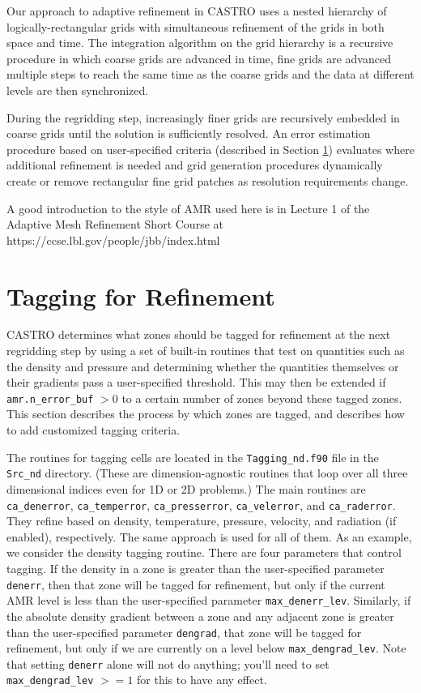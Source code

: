 Our approach to adaptive refinement in CASTRO uses a nested
hierarchy of logically-rectangular grids with simultaneous refinement
of the grids in both space and time.  The integration algorithm on the grid hierarchy
is a recursive procedure in which coarse grids are advanced in time,
fine grids are advanced multiple steps to reach the same time
as the coarse grids and the data at different levels are then synchronized.

During the regridding step, increasingly finer grids
are recursively embedded in coarse grids until the solution is
sufficiently resolved.  An error estimation procedure based on
user-specified criteria (described in Section \ref{sec:tagging}) 
evaluates where additional refinement is needed
and grid generation procedures dynamically create or
remove rectangular fine grid patches as resolution requirements change.

A good introduction to the style of AMR used here is in Lecture 1
of the Adaptive Mesh Refinement Short Course at
https://ccse.lbl.gov/people/jbb/index.html

\section{Tagging for Refinement}
\label{sec:tagging}

CASTRO determines what zones should be tagged for refinement at the next 
regridding step by using a set of built-in routines that test on 
quantities such as the density and pressure and determining whether the 
quantities themselves or their gradients pass a user-specified threshold. 
This may then be extended if {\tt amr.n\_error\_buf} $> 0$ to a certain number 
of zones beyond these tagged zones. This section describes the process 
by which zones are tagged, and describes how to add customized tagging criteria.

The routines for tagging cells are located in the {\tt Tagging\_nd.f90} file 
in the {\tt Src\_nd} directory. (These are dimension-agnostic routines that loop 
over all three dimensional indices even for 1D or 2D problems.) The main routines are 
{\tt ca\_denerror}, {\tt ca\_temperror}, {\tt ca\_presserror}, {\tt ca\_velerror}, 
and {\tt ca\_raderror}. They refine based on density, temperature, pressure, 
velocity, and radiation (if enabled), respectively. The same approach is used 
for all of them. As an example, we consider the density tagging routine. There 
are four parameters that control tagging. If the density in a zone is greater than 
the user-specified parameter {\tt denerr}, then that zone will be tagged 
for refinement, but only if the current AMR level is less than the 
user-specified parameter {\tt max\_denerr\_lev}. Similarly, 
if the absolute density gradient between a zone and any adjacent zone 
is greater than the user-specified parameter {\tt dengrad}, that zone 
will be tagged for refinement, but only if we are currently on a level 
below {\tt max\_dengrad\_lev}. Note that setting {\tt denerr} alone will 
not do anything; you'll need to set {\tt max\_dengrad\_lev} $>= 1$ for
this to have any effect.

